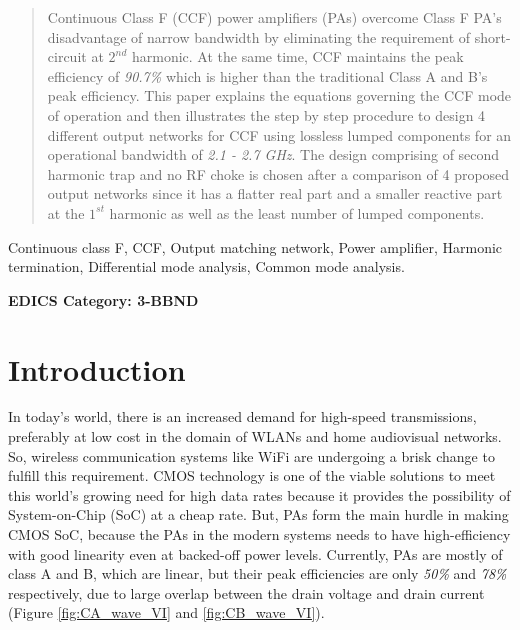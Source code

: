 \documentclass[conference]{IEEEtran}
\begin{document}




\maketitle

\begin{abstract}
Continuous Class F (CCF) power amplifiers (PAs) overcome Class F PA's disadvantage of narrow bandwidth by eliminating the requirement of short-circuit at $2^{nd}$ harmonic. At the same time, CCF maintains the peak efficiency of \textit{90.7\%} which is higher than the traditional Class A and B's peak efficiency. This paper explains the equations governing the CCF mode of operation and then illustrates the step by step procedure to design 4 different output networks for CCF using lossless lumped components for an operational bandwidth of \textit{2.1 - 2.7 GHz}. 
The design comprising of second harmonic trap and no RF choke is chosen after a comparison of 4 proposed output networks since it has a flatter real part and a smaller reactive part at the $1^{st}$ harmonic as well as the least number of lumped components.
\end{abstract}

\vspace{1mm}
\begin{IEEEkeywords}
Continuous class F, CCF, Output matching network, Power amplifier, Harmonic termination, Differential mode analysis, Common mode analysis. 
\end{IEEEkeywords}



\ifCLASSOPTIONpeerreview
\begin{center} \bfseries EDICS Category: 3-BBND \end{center}
\fi
%
\IEEEpeerreviewmaketitle
\section{Introduction}
In today's world, there is an increased demand for high-speed transmissions, preferably at low cost in the domain of WLANs and home audiovisual networks. So, wireless communication systems like WiFi are undergoing a brisk change to fulfill this requirement. CMOS technology is one of the viable solutions to meet this world's growing need for high data rates because it provides the possibility of System-on-Chip (SoC) at a cheap rate. But, PAs form the main hurdle in making CMOS SoC, because the PAs in the modern systems needs to have high-efficiency with good linearity even at backed-off power levels. Currently, PAs are mostly of class A and B, which are linear, but their peak efficiencies are only \textit{50\%} and \textit{78\%} respectively, due to large overlap between the drain voltage and drain current (Figure \ref{fig:CA_wave_VI} and \ref{fig:CB_wave_VI}).
\end{document}
